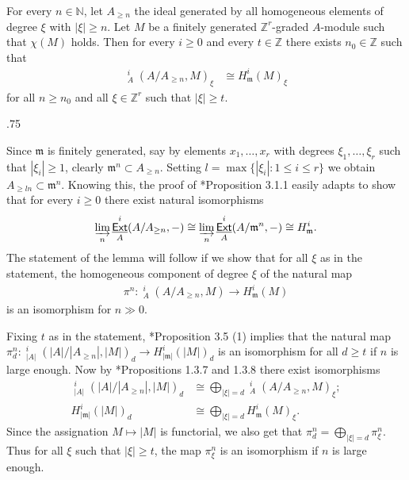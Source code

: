 \documentclass[11pt,fleqn]{article}
\makeatletter
\renewenvironment{proof}[1][\textit{Proof}]{\par
  \pushQED{\qed}%
  \normalfont \topsep.75\paraskip\relax
  \trivlist
  \item[\hskip\labelsep
        \itshape
    #1\@addpunct{.}]\ignorespaces
}{%
  \popQED\endtrivlist\@endpefalse
}
\newcommand\NN{\mathbb N}
\newcommand\ZZ{\mathbb Z}
\renewcommand\to{\longrightarrow}
\newcommand\m{\mathfrak m}
\DeclareMathOperator\GrExt{\underline{\mathsf{Ext}}}
\makeatother
\begin{document}
\begin{Lemma*}
For every $n \in \NN$, let $A_{\geq n}$ the ideal generated by all homogeneous 
elements of degree $\xi$ with $|\xi| \geq n$. Let $M$ be a finitely generated 
$\ZZ^r$-graded $A$-module such that $\chi(M)$ holds. Then for every $i \geq 0$ 
and every $t \in \ZZ$ there exists $n_0 \in \ZZ$ such that 
\begin{align*}
  \GrExt^i_A(A/A_{\geq n}, M)_\xi &\cong H^i_\m(M)_\xi
\end{align*}
for all $n \geq n_0$ and all $\xi \in \ZZ^r$ such that $|\xi| \geq t$.
\end{Lemma*}
\begin{proof}
Since $\m$ is finitely generated, say by elements $x_1, \ldots, x_r$ with 
degrees $\xi_1, \ldots, \xi_r$ such that $|\xi_i| \geq 1$, clearly $\m^n 
\subset A_{\geq n}$. Setting $l = \max \{|\xi_i| : 1 \leq i \leq r\}$ we 
obtain $A_{\geq ln} \subset \m^n$. Knowing this, the proof of 
\cite{BS}*{Proposition 3.1.1} easily adapts to show that for every $i \geq 0$ 
there exist natural isomorphisms
\begin{align*}
\varinjlim_n \GrExt^i_A(A/A_{\geq n}, -) 
  \cong \varinjlim_n \GrExt^i_A(A/\m^n, -) 
  \cong H^i_\m.
\end{align*} 
The statement of the lemma will follow if we show that for all $\xi$ as in the
statement, the homogeneous component of degree $\xi$ of the natural map
\begin{align*}
  \pi^n: \GrExt^i_A(A/A_{\geq n}, M) \to H^i_\m(M)
\end{align*}
is an isomorphism for $n \gg 0$.

Fixing $t$ as in the statement, \cite{AZ}*{Proposition 3.5 (1)} implies that
the natural map $\pi^n_d: \GrExt^i_{|A|}(|A|/|A_{\geq n}|, |M|)_d \to 
H^i_{|\m|}(|M|)_d$ is an isomorphism for all $d \geq t$ if $n$ is large 
enough. Now by \cite{RZ2}*{Propositions 1.3.7 and 1.3.8} there exist 
isomorphisms
\begin{align*}
\GrExt^i_{|A|}(|A|/|A_{\geq n}|, |M|)_d 
&\cong \bigoplus_{|\xi| = d}\GrExt^i_{A}(A/A_{\geq n}, M)_\xi;\\
H^i_{|\m|}(|M|)_d 
  &\cong \bigoplus_{|\xi| = d} H^i_\m(M)_\xi.
\end{align*}
Since the assignation $M \mapsto |M|$ is functorial, we also get that 
$\pi^n_d = \bigoplus_{|\xi| = d} \pi^n_\xi$. Thus for all $\xi$ such
that $|\xi| \geq t$, the map $\pi^n_\xi$ is an isomorphism if $n$ is large 
enough.
\end{proof}
\end{document}
